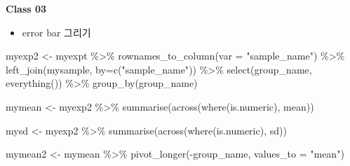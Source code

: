 \documentclass[
]{book}
\newenvironment{Shaded}{\begin{snugshade}}{\end{snugshade}}
\newcommand{\AttributeTok}[1]{\textcolor[rgb]{0.77,0.63,0.00}{#1}}
\newcommand{\FunctionTok}[1]{\textcolor[rgb]{0.00,0.00,0.00}{#1}}
\newcommand{\NormalTok}[1]{#1}
\newcommand{\OtherTok}[1]{\textcolor[rgb]{0.56,0.35,0.01}{#1}}
\newcommand{\SpecialCharTok}[1]{\textcolor[rgb]{0.00,0.00,0.00}{#1}}
\newcommand{\StringTok}[1]{\textcolor[rgb]{0.31,0.60,0.02}{#1}}
\providecommand{\tightlist}{%
  \setlength{\itemsep}{0pt}\setlength{\parskip}{0pt}}
\begin{document}
\textbf{Class 03}

\begin{itemize}
\tightlist
\item
  error bar 그리기
\end{itemize}

\begin{Shaded}
\begin{Highlighting}[]
\NormalTok{myexp2 }\OtherTok{\textless{}{-}}\NormalTok{ myexpt }\SpecialCharTok{\%\textgreater{}\%} 
  \FunctionTok{rownames\_to\_column}\NormalTok{(}\AttributeTok{var =} \StringTok{"sample\_name"}\NormalTok{) }\SpecialCharTok{\%\textgreater{}\%} 
  \FunctionTok{left\_join}\NormalTok{(mysample, }\AttributeTok{by=}\FunctionTok{c}\NormalTok{(}\StringTok{"sample\_name"}\NormalTok{)) }\SpecialCharTok{\%\textgreater{}\%} 
  \FunctionTok{select}\NormalTok{(group\_name, }\FunctionTok{everything}\NormalTok{()) }\SpecialCharTok{\%\textgreater{}\%} 
  \FunctionTok{group\_by}\NormalTok{(group\_name)}

\NormalTok{mymean }\OtherTok{\textless{}{-}}\NormalTok{ myexp2 }\SpecialCharTok{\%\textgreater{}\%} 
  \FunctionTok{summarise}\NormalTok{(}\FunctionTok{across}\NormalTok{(}\FunctionTok{where}\NormalTok{(is.numeric), mean))}

\NormalTok{mysd }\OtherTok{\textless{}{-}}\NormalTok{ myexp2 }\SpecialCharTok{\%\textgreater{}\%} 
  \FunctionTok{summarise}\NormalTok{(}\FunctionTok{across}\NormalTok{(}\FunctionTok{where}\NormalTok{(is.numeric), sd))}

\NormalTok{mymean2 }\OtherTok{\textless{}{-}}\NormalTok{ mymean }\SpecialCharTok{\%\textgreater{}\%} 
  \FunctionTok{pivot\_longer}\NormalTok{(}\SpecialCharTok{{-}}\NormalTok{group\_name, }\AttributeTok{values\_to =} \StringTok{"mean"}\NormalTok{)}
\end{Highlighting}
\end{Shaded}
\end{document}

